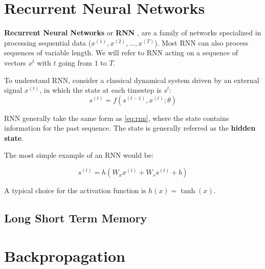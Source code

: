
\section{Recurrent Neural Networks}

\textbf{Recurrent Neural Networks} or \textbf{RNN} \parencite{rumelhart}, are a family of networks specialized in processing sequential data (\(x^{(1)}, x^{(2)}, \ldots, x^{(T)}\)). Most RNN can also process sequences of variable length. We will refer to RNN acting on a sequence of vectors \(x^{t}\) with \(t\) going from \(1\) to \(T\).

To understand RNN, consider a classical dynamical system driven by an external signal \(x^{(t)}\), in which the state at each timestep is \(s^{t}\):
\begin{equation} \label{eq:rnn}
s^{(t)} = f\left(s^{(t-1)}, x^{(t)}; \theta\right)
\end{equation}

RNN generally take the same form as \ref{eq:rnn}, where the state contains information for the past sequence. The state is generally referred as the \textbf{hidden state}. 

The most simple example of an RNN would be:

\begin{equation} \label{eq:rnn}
s^{(t)} = h\left(W_x x^{(t)} + W_s s^{(t)} + b\right)
\end{equation}

A typical choice for the activation function is \(h(x) = \tanh(x)\).

\subsection{Long Short Term Memory}



\section{Backpropagation}
